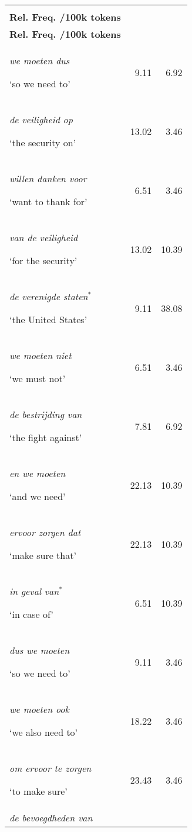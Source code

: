 \documentclass[output=paper]{langscibook}
\begin{document}
\begin{table}
\small
\begin{tabularx}{\textwidth}{Xrr} 
\lsptoprule
& \makecell[tr]{{\bfseries INT}\\
{\bfseries Rel. Freq. /100k tokens}} & \makecell[tr]{{\bfseries MEPs}\\
{\bfseries Rel. Freq. /100k tokens}}\\
\midrule
\textit{we moeten dus}  

‘so we need to’ &  9.11 &  6.92\\
\rule{0pt}{1.2em}{\itshape de veiligheid op} 

‘the security on’ &  13.02 &  3.46\\
\rule{0pt}{1.2em}{\itshape willen danken voor}

 ‘want to thank for’ &  6.51 &  3.46\\
\rule{0pt}{1.2em}{\itshape van de veiligheid} 

‘for the security’ &  13.02 &  10.39\\
\rule{0pt}{1.2em}{\itshape de verenigde staten}$^{*}$

‘the United States’ &  9.11 &  38.08\\
\rule{0pt}{1.2em}\textit{we moeten niet} 

‘we must not’ &  6.51 &  3.46\\
\rule{0pt}{1.2em}\textit{de bestrijding van} 

‘the fight against’ &  7.81 &  6.92\\
\rule{0pt}{1.2em}{\itshape en we moeten} 

‘and we need’ &  22.13 &  10.39\\
\rule{0pt}{1.2em}\textit{ervoor zorgen dat} 

‘make sure that’ &  22.13 &  10.39\\
\rule{0pt}{1.2em}{\itshape in geval van}$^{*}$

‘in case of’ &  6.51 &  10.39\\
\rule{0pt}{1.2em}{\itshape dus we moeten} 

‘so we need to’ &  9.11 &  3.46\\
\rule{0pt}{1.2em}\textit{we moeten ook} 

‘we also need to’ &  18.22 &  3.46\\
\rule{0pt}{1.2em}\textit{om ervoor te zorgen} 

‘to make sure’ &  23.43 &  3.46\\
\rule{0pt}{1.2em}\textit{de bevoegdheden van} 


\end{tabularx}
\end{table}
\end{document}
